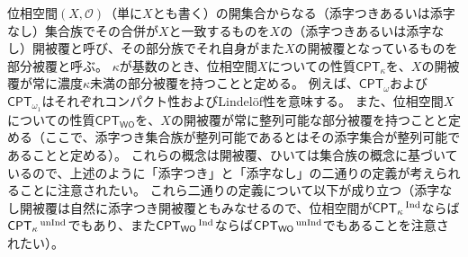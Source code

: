 \documentclass{jarticle}
\newcommand{\WithIndex}[1]{$\textrm{#1}{}^{\,\textrm{\scriptsize Ind}}$}
\newcommand{\WithoutIndex}[1]{$\textrm{#1}{}^{\,\textrm{\scriptsize unInd}}$}
\begin{document}
位相空間$(X,\mathcal{O})$（単に$X$とも書く）の開集合からなる（添字つきあるいは添字なし）集合族でその合併が$X$と一致するものを$X$の（添字つきあるいは添字なし）開被覆と呼び、その部分族でそれ自身がまた$X$の開被覆となっているものを部分被覆と呼ぶ。
$\kappa$が基数のとき、位相空間$X$についての性質$\mathsf{CPT}_{\kappa}$を、$X$の開被覆が常に濃度$\kappa$未満の部分被覆を持つことと定める。
例えば、$\mathsf{CPT}_{\omega}$および$\mathsf{CPT}_{\omega_1}$はそれぞれコンパクト性およびLindel\"{o}f性を意味する。
また、位相空間$X$についての性質$\mathsf{CPT}_{\mathsf{WO}}$を、$X$の開被覆が常に整列可能な部分被覆を持つことと定める（ここで、添字つき集合族が整列可能であるとはその添字集合が整列可能であることと定める）。
これらの概念は開被覆、ひいては集合族の概念に基づいているので、上述のように「添字つき」と「添字なし」の二通りの定義が考えられることに注意されたい。
これら二通りの定義について以下が成り立つ（添字なし開被覆は自然に添字つき開被覆ともみなせるので、位相空間が\WithIndex{$\mathsf{CPT}_{\kappa}$}ならば\WithoutIndex{$\mathsf{CPT}_{\kappa}$}でもあり、また\WithIndex{$\mathsf{CPT}_{\mathsf{WO}}$}ならば\WithoutIndex{$\mathsf{CPT}_{\mathsf{WO}}$}でもあることを注意されたい）。
\end{document}
